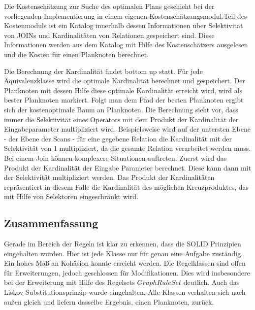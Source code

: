 Die Kostenschätzung zur Suche des optimalen Plans geschieht bei der vorliegenden Implementierung in einem eigenen Kostenschätzungsmodul.Teil des Kostenmoduls ist ein Katalog innerhalb dessen Informationen über Selektivität von JOINs und Kardinalitäten von Relationen gespeichert sind. Diese Informationen werden aus dem Katalog mit Hilfe des Kostenschätzers ausgelesen und die Kosten für einen Planknoten berechnet.

Die Berechnung der Kardinalität findet bottom up statt. Für jede Äquivalenzklasse wird die optimale Kardinalität berechnet und gespeichert. Der Planknoten mit dessen Hilfe diese optimale Kardinalität erreicht wird, wird als bester Planknoten markiert. Folgt man dem Pfad der besten Planknoten ergibt sich der kostenoptimale Baum an Planknoten. Die Berechnung sieht vor, dass immer die Selektivität eines Operators mit dem Produkt der Kardinalität der Eingabeparameter multipliziert wird. Beispielsweise wird auf der untersten Ebene - der Ebene der Scans - für eine gegebene Relation die Kardinalität mit der Selektivität von 1 multipliziert, da die gesamte Relation verarbeitet werden muss. Bei einem Join können komplexere Situationen auftreten. Zuerst wird das Produkt der Kardinalität der Eingabe Parameter berechnet. Diese kann dann mit der 
Selektivität multipliziert werden. Das Produkt der Kardinalitäten repräsentiert in diesem Falle die Kardinalität des möglichen Kreuzproduktes, das mit Hilfe von Selektoren eingeschränkt wird.



\subsection{Zusammenfassung}

Gerade im Bereich der Regeln ist klar zu erkennen, dass die SOLID Prinzipien eingehalten wurden. Hier ist jede Klasse nur für genau eine Aufgabe zuständig. Ein hohes Maß an Kohäsion konnte erreicht werden. Die Regelklassen  sind offen für Erweiterungen, jedoch geschlossen für Modifikationen. Dies wird insbesondere bei der Erweiterung mit Hilfe des Regelsets $GraphRuleSet$ deutlich. Auch das Liskov Substitutionsprinzip wurde eingehalten. Alle Klassen verhalten sich nach außen gleich und liefern dasselbe Ergebnis, einen Planknoten, zurück. 